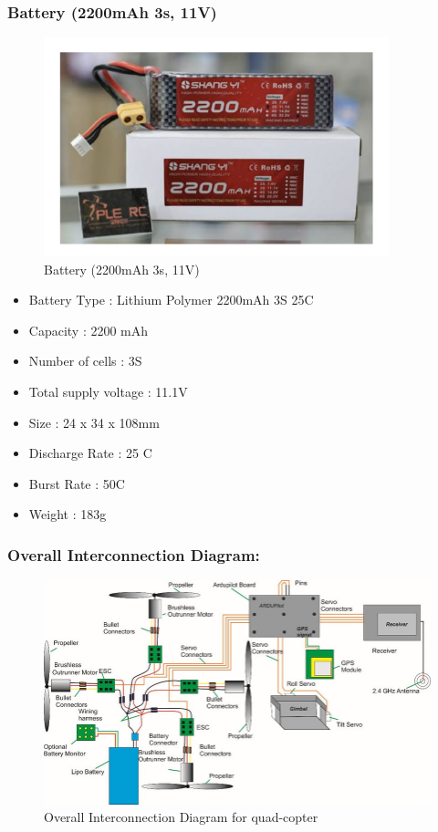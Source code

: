 \subsubsection{Battery (2200mAh 3s, 11V)}
\begin{figure}[h!]
\centering
\includegraphics[width=10cm]{./Figures/battery_qc.png}
\caption{Battery (2200mAh 3s, 11V)}
\label{battery_qc}
\end{figure}

\begin{itemize}
    \item Battery Type		: Lithium Polymer 2200mAh 3S 25C
    \item Capacity		: 2200 mAh
    \item Number of cells		: 3S
    \item Total supply voltage	: 11.1V 
    \item Size			: 24 x 34 x 108mm 
    \item Discharge Rate 		: 25 C
    \item Burst Rate 		: 50C
    \item Weight			: 183g 
\end{itemize}

\subsubsection{Overall Interconnection Diagram:}
\begin{figure}[h!]
\centering
\includegraphics[width=\columnwidth]{./Figures/overall_conn_dia_qc.png}
\caption{Overall Interconnection Diagram for quad-copter}
\label{overall_conn_dia_qc}
\end{figure}

